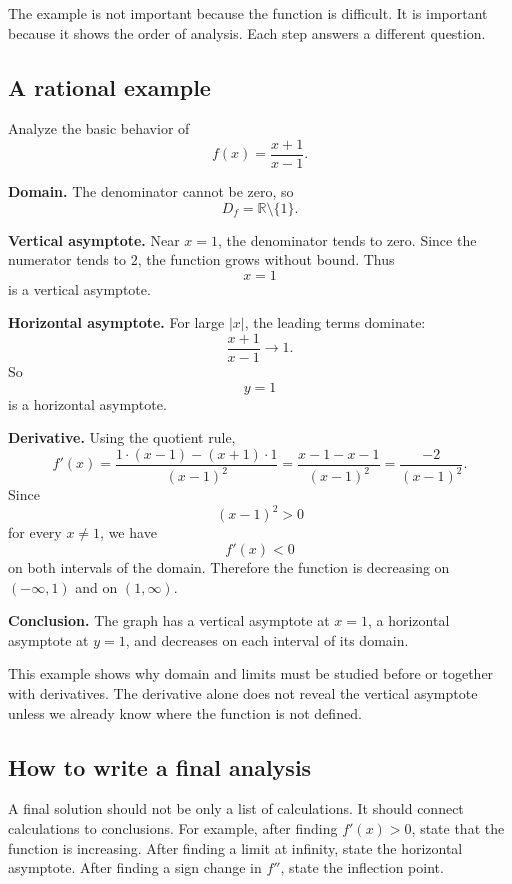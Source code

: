 The example is not important because the function is difficult. It is important because it shows the order of analysis. Each step answers a different question.

\subsection*{A rational example}

\begin{examplebox}
Analyze the basic behavior of
\[
f(x)=\frac{x+1}{x-1}.
\]

\textbf{Domain.} The denominator cannot be zero, so
\[
D_f=\mathbb{R}\setminus\{1\}.
\]

\textbf{Vertical asymptote.} Near \(x=1\), the denominator tends to zero. Since the numerator tends to \(2\), the function grows without bound. Thus
\[
x=1
\]
is a vertical asymptote.

\textbf{Horizontal asymptote.} For large \(|x|\), the leading terms dominate:
\[
\frac{x+1}{x-1}\to1.
\]
So
\[
y=1
\]
is a horizontal asymptote.

\textbf{Derivative.} Using the quotient rule,
\[
f'(x)=\frac{1\cdot(x-1)-(x+1)\cdot1}{(x-1)^2}
=\frac{x-1-x-1}{(x-1)^2}
=\frac{-2}{(x-1)^2}.
\]
Since
\[
(x-1)^2>0
\]
for every \(x\ne1\), we have
\[
f'(x)<0
\]
on both intervals of the domain. Therefore the function is decreasing on \((-\infty,1)\) and on \((1,\infty)\).

\textbf{Conclusion.} The graph has a vertical asymptote at \(x=1\), a horizontal asymptote at \(y=1\), and decreases on each interval of its domain.
\end{examplebox}

This example shows why domain and limits must be studied before or together with derivatives. The derivative alone does not reveal the vertical asymptote unless we already know where the function is not defined.

\subsection*{How to write a final analysis}

A final solution should not be only a list of calculations. It should connect calculations to conclusions. For example, after finding \(f'(x)>0\), state that the function is increasing. After finding a limit at infinity, state the horizontal asymptote. After finding a sign change in \(f''\), state the inflection point.

